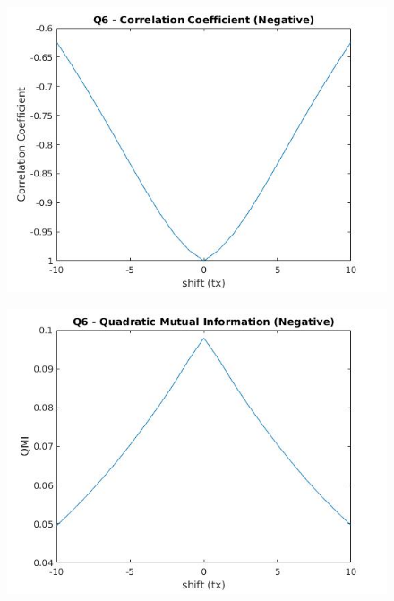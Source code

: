 \documentclass[12pt]{article}
\begin{document}
\begin{figure} [h!]
\includegraphics[width=\linewidth]{corr_neg.jpg}
\caption{}
\label{fig:6.3}
\end{figure}

\begin{figure} [h!]
\includegraphics[width=\linewidth]{qmi_neg.jpg}
\caption{}
\label{fig:6.4}
\end{figure}
\end{document}
